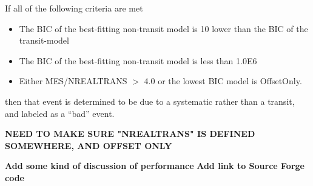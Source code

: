 


If all of the following criteria are met

\begin{itemize}
\item The BIC of the best-fitting non-transit model is 10 lower than the BIC of the transit-model
\item The BIC of the best-fitting non-transit model is less than 1.0E6
\item Either MES/NREALTRANS $>$ 4.0 or the lowest BIC model is OffsetOnly.
\end{itemize}

\noindent then that event is determined to be due to a systematic rather than a transit, and labeled as a ``bad'' event. 

{\bf NEED TO MAKE SURE "NREALTRANS" IS DEFINED SOMEWHERE, AND OFFSET ONLY}


{\bf Add some kind of discussion of performance}
{\bf Add link to Source Forge code}


